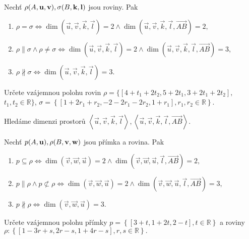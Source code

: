 \begin{veta}
    Nechť $\rho(A,\vec u, \vec v), \linebreak\sigma(B,\vec k, \vec l)$ jsou roviny. Pak
    \begin{enumerate}[$i.$]
    \item $\rho = \sigma \iff \dim (\vec u, \vec v, \vec k, \vec l) = 2 \land \dim (\vec u, \vec v, \vec k, \vec l, \overrightarrow{AB})=2,$
   	\item $\rho \parallel \sigma \land \rho \ne \sigma \iff \dim (\vec u, \vec v, \vec k, \vec l) = 2 \land \dim (\vec u, \vec v, \vec k, \vec l, \overrightarrow{AB})=3,$
   	\item $\rho \nparallel \sigma \iff \dim (\vec u, \vec v, \vec k, \vec l) = 3$.
    \end{enumerate}
\end{veta}

\begin{priklad}
Určete vzájemnou polohu rovin $\rho = \{ [4+t_1+2t_2,5+2t_1,3+2t_1+2t_2],$ $t_1,t_2\in \mathbb R \}$,
$\sigma = \left \{ [1+2r_1+r_2,-2-2r_1-2r_2,1+r_1],r_1,r_2\in \mathbb R \right \}. $
\end{priklad}

\begin{reseni}
Hledáme dimenzi prostorů $\left < \vec u, \vec v, \vec k, \vec l \right >, \left < \vec u, \vec v, \vec k, \vec l, \overrightarrow{AB} \right > .$
\end{reseni}

\begin{veta}
    Nechť $p(A,\vec u),\linebreak \rho(B,\vec v, \vec w)$ jsou přímka a rovina. Pak
    \begin{enumerate}[$i.$]
    \item $p\subseteq \rho \iff \dim (\vec v, \vec w, \vec u) = 2 \land \dim (\vec v, \vec w, \vec u, \vec l, \overrightarrow{AB})=2,$
   	\item $p \parallel \rho \land p \not\subset \rho \iff \dim (\vec v, \vec w, \vec u) = 2 \land \dim (\vec v, \vec w, \vec u, \vec l, \overrightarrow{AB})=3,$
   	\item $p \nparallel \rho \iff \dim (\vec v, \vec w, \vec u) = 3$.
    \end{enumerate}
\end{veta}

\begin{priklad}
Určete vzájemnou polohu přímky $p=\left \{ [3+t,1+2t,2-t],t \in \mathbb R \right \} $
a roviny $\rho:\left \{ [1-3r+s,2r-s,1+4r-s],r,s\in \mathbb R \right \} .$
\end{priklad}

